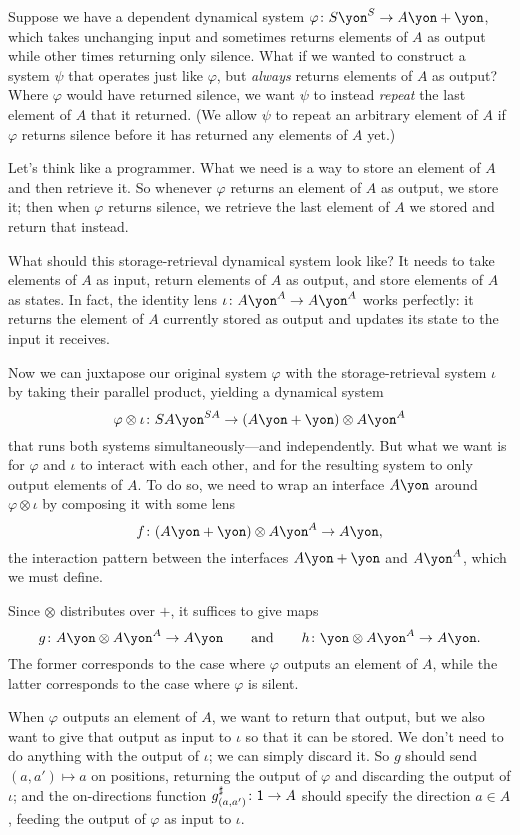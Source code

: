 \documentclass[Book-Poly]{subfiles}
\begin{document}
\begin{example}[Repeater]
Suppose we have a dependent dynamical system $\varphi\colon S\yon^S\to A\yon+\yon$, which takes unchanging input and sometimes returns elements of $A$ as output while other times returning only silence.
What if we wanted to construct a system $\psi$ that operates just like $\varphi$, but \emph{always} returns elements of $A$ as output?
Where $\varphi$ would have returned silence, we want $\psi$ to instead \emph{repeat} the last element of $A$ that it returned. (We allow $\psi$ to repeat an arbitrary element of $A$ if $\varphi$ returns silence before it has returned any elements of $A$ yet.)

Let's think like a programmer.
What we need is a way to store an element of $A$ and then retrieve it.
So whenever $\varphi$ returns an element of $A$ as output, we store it; then when $\varphi$ returns silence, we retrieve the last element of $A$ we stored and return that instead.

What should this storage-retrieval dynamical system look like?
It needs to take elements of $A$ as input, return elements of $A$ as output, and store elements of $A$ as states.
In fact, the identity lens $\iota\colon A\yon^A\to A\yon^A$ works perfectly: it returns the element of $A$ currently stored as output and updates its state to the input it receives.

Now we can juxtapose our original system $\varphi$ with the storage-retrieval system $\iota$ by taking their parallel product, yielding a dynamical system
\[
    \varphi\otimes\iota\colon SA\yon^{SA}\to (A\yon+\yon)\otimes A\yon^A
\]
that runs both systems simultaneously---and independently.
But what we want is for $\varphi$ and $\iota$ to interact with each other, and for the resulting system to only output elements of $A$.
To do so, we need to wrap an interface $A\yon$ around $\varphi\otimes\iota$ by composing it with some lens
\[
    f\colon(A\yon+\yon)\otimes A\yon^A\to A\yon,
\]
the interaction pattern between the interfaces $A\yon+\yon$ and $A\yon^A$, which we must define.

Since $\otimes$ distributes over $+$, it suffices to give maps
\[
    g\colon A\yon\otimes A\yon^A\to A\yon \qqand h\colon\yon\otimes A\yon^A\to A\yon.
\]
The former corresponds to the case where $\varphi$ outputs an element of $A$, while the latter corresponds to the case where $\varphi$ is silent.

When $\varphi$ outputs an element of $A$, we want to return that output, but we also want to give that output as input to $\iota$ so that it can be stored.
We don't need to do anything with the output of $\iota$; we can simply discard it.
So $g$ should send $(a,a')\mapsto a$ on positions, returning the output of $\varphi$ and discarding the output of $\iota$; and the on-directions function $g^\sharp_{(a,a')}\colon\textsf{1}\to A$ should specify the direction $a\in A$, feeding the output of $\varphi$ as input to $\iota$.


\end{example}
\end{document}
